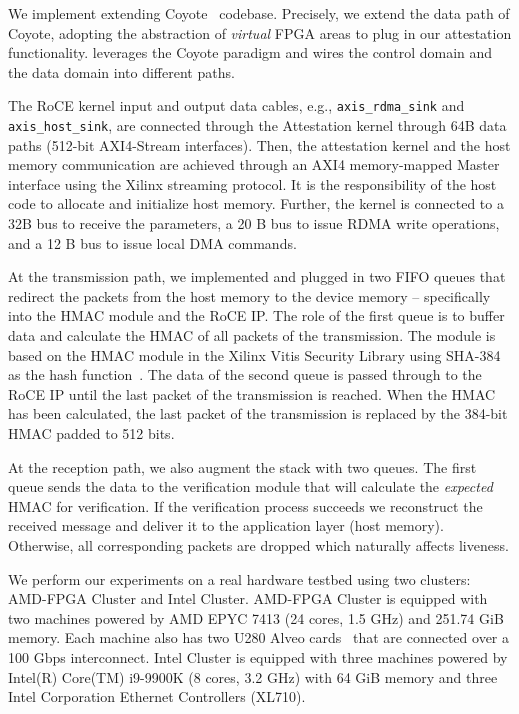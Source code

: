 We implement \projecttitle{} extending Coyote~\cite{coyote} codebase. Precisely, we extend the data path of Coyote, adopting the abstraction of {\em virtual} FPGA areas to plug in our attestation functionality. \projecttitle{} leverages the Coyote paradigm and wires the control domain and the data domain into different paths.

The RoCE kernel input and output data cables, e.g., \texttt{axis\_rdma\_sink} and \texttt{axis\_host\_sink}, are connected through the Attestation kernel through 64B data paths (512-bit AXI4-Stream interfaces). Then, the attestation kernel and the host memory communication are achieved through an AXI4 memory-mapped Master interface using the Xilinx streaming protocol. It is the responsibility of the host code to allocate and initialize host memory. Further, the kernel is connected to a 32B bus to receive the parameters, a 20 B bus to issue RDMA write operations, and a 12 B bus to issue local DMA commands.

At the transmission path, we implemented and plugged in two FIFO queues that redirect the packets from the host memory to the device memory -- specifically into the HMAC module and the RoCE IP. The role of the first queue is to buffer data and calculate the HMAC of all packets of the transmission.
The module is based on the HMAC module in the Xilinx Vitis Security Library using SHA-384 as the hash function~\cite{vitis-security-lib}.
The data of the second queue is passed through to the RoCE IP until the last packet of the transmission is reached.
When the HMAC has been calculated, the last packet of the transmission is replaced by the 384-bit HMAC padded to 512 bits.

At the reception path, we also augment the stack with two queues.
The first queue sends the data to the verification module that will calculate the {\em expected} HMAC for verification. If the verification process succeeds we reconstruct the received message and deliver it to the application layer (host memory). Otherwise, all corresponding packets are dropped which naturally affects liveness.
\fi 

We perform our experiments on a real hardware testbed using two clusters: AMD-FPGA Cluster and Intel Cluster. AMD-FPGA Cluster is equipped with two machines powered by AMD EPYC 7413 (24 cores, 1.5 GHz) and 251.74 GiB memory. Each machine also has two U280 Alveo cards~\cite{u280_smartnics} that are connected over a 100 Gbps interconnect. Intel Cluster is equipped with three machines powered by Intel(R) Core(TM) i9-9900K (8 cores, 3.2 GHz) with 64 GiB memory and three Intel Corporation Ethernet Controllers (XL710).

